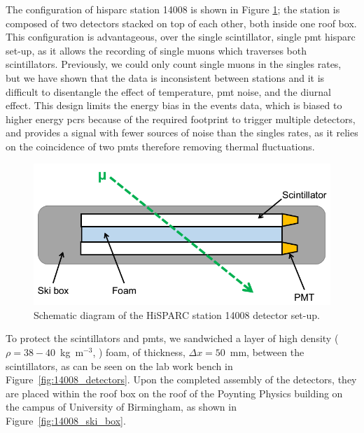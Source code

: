 The configuration of \gls{hisparc} station 14008 is shown in Figure \ref{fig:14008_config}; the station is composed of two detectors stacked on top of each other, both inside one roof box. This configuration is advantageous, over the single scintillator, single \gls{pmt} \gls{hisparc} set-up, as it allows the recording of single muons which traverses both scintillators. Previously, we could only count single muons in the singles rates, but we have shown that the data is inconsistent between stations and it is difficult to disentangle the effect of temperature, \gls{pmt} noise, and the diurnal effect. This design limits the energy bias in the events data, which is biased to higher energy \glspl{pcr} because of the required footprint to trigger multiple detectors, and provides a signal with fewer sources of noise than the singles rates, as it relies on the coincidence of two \glspl{pmt} therefore removing thermal fluctuations.

\begin{figure}[ht!]
	\center
	\includegraphics[width=0.75\columnwidth]{14008_config.png}
	\caption{Schematic diagram of the HiSPARC station 14008 detector set-up.}
	\label{fig:14008_config}
\end{figure}

To protect the scintillators and \glspl{pmt}, we sandwiched a layer of high density ($\rho = 38-40$~kg~m$^{-3}$, \citet{efoam_sf38_2017}) foam, of thickness, $\Delta x = 50$~mm, between the scintillators, as can be seen on the lab work bench in Figure~\ref{fig:14008_detectors}. Upon the completed assembly of the detectors, they are placed within the roof box on the roof of the Poynting Physics building on the campus of University of Birmingham, as shown in Figure~\ref{fig:14008_ski_box}.

